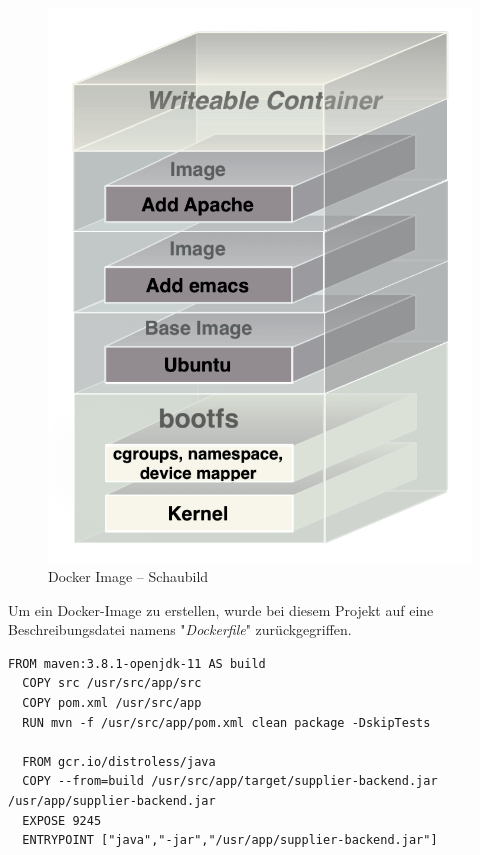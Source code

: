 \begin{figure}[ht!]
	\centering
	\includegraphics[width=.6\linewidth]{kapitel/problemloesung/implementierung/_img/docker-image-fig}
	\caption[Docker Image -- Schaubild]{Docker Image -- Schaubild \cite[Seite~72]{turnbulldocker}}
	\label{fig:dockerImage}
\end{figure}

Um ein Docker-Image zu erstellen, wurde bei diesem Projekt auf eine Beschreibungsdatei namens "\emph{Dockerfile}" zurückgegriffen.

\begin{minipage}{\linewidth}
\begin{lstlisting}[style=javaStyle,caption={Dockerfile - Supplier},label=lst:supplierDockerfile]
  FROM maven:3.8.1-openjdk-11 AS build
  COPY src /usr/src/app/src
  COPY pom.xml /usr/src/app
  RUN mvn -f /usr/src/app/pom.xml clean package -DskipTests

  FROM gcr.io/distroless/java
  COPY --from=build /usr/src/app/target/supplier-backend.jar /usr/app/supplier-backend.jar
  EXPOSE 9245
  ENTRYPOINT ["java","-jar","/usr/app/supplier-backend.jar"]
\end{lstlisting}
\end{minipage}

